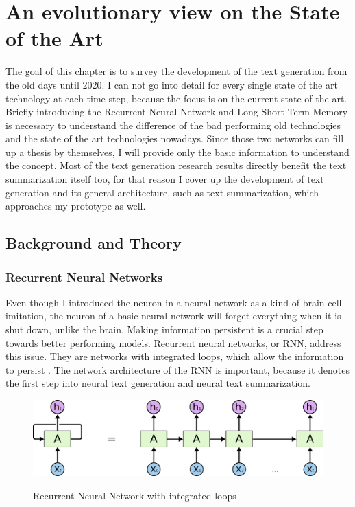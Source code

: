 \chapter{An evolutionary view on the State of the Art}\label{ch:sota}

The goal of this chapter is to survey the development of the text generation from the old days until 2020. I can not go into detail for every single state of the art technology at each time step, because the focus is on the current state of the art. Briefly introducing the Recurrent Neural Network and Long Short Term Memory is necessary to understand the difference of the bad performing old technologies and the state of the art technologies nowadays. Since those two networks can fill up a thesis by themselves, I will provide only the basic information to understand the concept. Most of the text generation research results directly benefit the text summarization itself too, for that reason I cover up the development of text generation and its general architecture, such as text summarization, which approaches my prototype as well.  

\section{Background and Theory}


\subsection{Recurrent Neural Networks}
Even though I introduced the neuron in a neural network as a kind of brain cell imitation, the neuron of a basic neural network will forget everything when it is shut down, unlike the brain. Making information persistent is a crucial step towards better performing models. Recurrent neural networks, or RNN, address this issue. They are networks with integrated loops, which allow the information to persist \cite{olah}. The network architecture of the RNN is important, because it denotes the first step into neural text generation and neural text summarization. 

\begin{figure}
	\begin{center}
		\includegraphics[width=4.5in]{photos/RNN-unrolled}\\
		\caption{Recurrent Neural Network with integrated loops \cite{olah}}\label{rnn}
	\end{center}
\end{figure}

